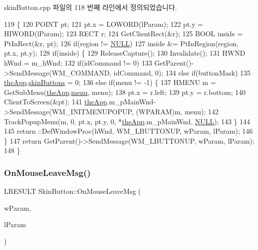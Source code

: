 skin\+Button.\+cpp 파일의 118 번째 라인에서 정의되었습니다.


\begin{DoxyCode}
119 \{
120   POINT pt;
121   pt.x = LOWORD(lParam);
122   pt.y = HIWORD(lParam);
123   RECT r;
124   GetClientRect(&r);
125   BOOL inside = PtInRect(&r, pt);
126   \textcolor{keywordflow}{if}(region != \mbox{\hyperlink{getopt1_8c_a070d2ce7b6bb7e5c05602aa8c308d0c4}{NULL}})
127     inside &= PtInRegion(region, pt.x, pt.y);
128   \textcolor{keywordflow}{if}(inside) \{
129     ReleaseCapture();
130     Invalidate();
131     HWND hWnd = m\_hWnd;
132     \textcolor{keywordflow}{if}(idCommand != 0)
133       GetParent()->SendMessage(WM\_COMMAND, idCommand, 0);
134     \textcolor{keywordflow}{else} \textcolor{keywordflow}{if}(buttonMask)
135       \mbox{\hyperlink{_v_b_a_8cpp_a8095a9d06b37a7efe3723f3218ad8fb3}{theApp}}.\mbox{\hyperlink{class_v_b_a_a18dd81b37aa33a8f580a2dabe358a280}{skinButtons}} = 0;
136     \textcolor{keywordflow}{else} \textcolor{keywordflow}{if}(menu != -1) \{
137       HMENU m = GetSubMenu(\mbox{\hyperlink{_v_b_a_8cpp_a8095a9d06b37a7efe3723f3218ad8fb3}{theApp}}.\mbox{\hyperlink{class_v_b_a_acf9d855b5b959a2df9c6cb21b888366e}{menu}}, menu);
138       pt.x = r.left;
139       pt.y = r.bottom;
140       ClientToScreen(&pt);
141       \mbox{\hyperlink{_v_b_a_8cpp_a8095a9d06b37a7efe3723f3218ad8fb3}{theApp}}.m\_pMainWnd->SendMessage(WM\_INITMENUPOPUP, (WPARAM)m, menu);
142       TrackPopupMenu(m, 0, pt.x, pt.y, 0, *\mbox{\hyperlink{_v_b_a_8cpp_a8095a9d06b37a7efe3723f3218ad8fb3}{theApp}}.m\_pMainWnd, \mbox{\hyperlink{getopt1_8c_a070d2ce7b6bb7e5c05602aa8c308d0c4}{NULL}});
143     \}
144 
145     return ::DefWindowProc(hWnd, WM\_LBUTTONUP, wParam, lParam);
146   \}
147   \textcolor{keywordflow}{return} GetParent()->SendMessage(WM\_LBUTTONUP, wParam, lParam);
148 \}
\end{DoxyCode}
\mbox{\label{class_skin_button_a9ceb207ee0e34032dd2bc12c3da24e15}} 
\subsubsection{\texorpdfstring{On\+Mouse\+Leave\+Msg()}{OnMouseLeaveMsg()}}
{\footnotesize\ttfamily L\+R\+E\+S\+U\+LT Skin\+Button\+::\+On\+Mouse\+Leave\+Msg (\begin{DoxyParamCaption}\item[{W\+P\+A\+R\+AM}]{w\+Param,  }\item[{L\+P\+A\+R\+AM}]{l\+Param }\end{DoxyParamCaption})}



